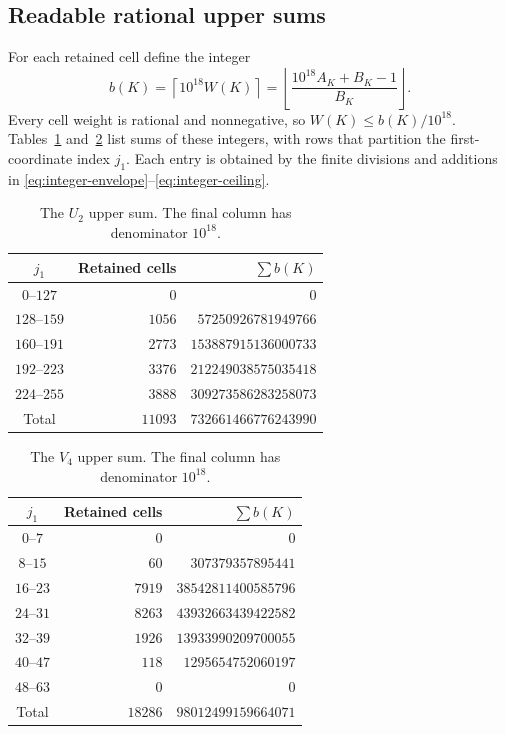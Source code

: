 \documentclass{amsart}
\numberwithin{equation}{section}
\numberwithin{table}{section}
\begin{document}
\subsection{Readable rational upper sums}

For each retained cell define the integer
\begin{equation}\label{eq:integer-ceiling}
b(K)=\left\lceil10^{18}W(K)\right\rceil
=\left\lfloor\frac{10^{18}A_K+B_K-1}{B_K}\right\rfloor.
\end{equation}
Every cell weight is rational and nonnegative, so
$W(K)\le b(K)/10^{18}$.
Tables~\ref{tab:U2-integers} and~\ref{tab:V4-integers} list sums of these
integers, with rows that partition the first-coordinate index $j_1$.
Each entry is obtained by the finite divisions and additions
in \eqref{eq:integer-envelope}--\eqref{eq:integer-ceiling}.

\begin{table}[htbp]
\caption{The $U_2$ upper sum. The final column has denominator $10^{18}$.}
\label{tab:U2-integers}
\centering\small
\renewcommand{\arraystretch}{1.2}
\begin{tabular}{@{}crr@{}}
\hline
$j_1$ & Retained cells & $\sum b(K)$\\
\hline
$0$--$127$ & $0$ & $0$\\
$128$--$159$ & $1056$ & $57250926781949766$\\
$160$--$191$ & $2773$ & $153887915136000733$\\
$192$--$223$ & $3376$ & $212249038575035418$\\
$224$--$255$ & $3888$ & $309273586283258073$\\
\hline
Total & $11093$ & $732661466776243990$\\
\hline
\end{tabular}
\end{table}

\begin{table}[htbp]
\caption{The $V_4$ upper sum. The final column has denominator $10^{18}$.}
\label{tab:V4-integers}
\centering\small
\renewcommand{\arraystretch}{1.2}
\begin{tabular}{@{}crr@{}}
\hline
$j_1$ & Retained cells & $\sum b(K)$\\
\hline
$0$--$7$ & $0$ & $0$\\
$8$--$15$ & $60$ & $307379357895441$\\
$16$--$23$ & $7919$ & $38542811400585796$\\
$24$--$31$ & $8263$ & $43932663439422582$\\
$32$--$39$ & $1926$ & $13933990209700055$\\
$40$--$47$ & $118$ & $1295654752060197$\\
$48$--$63$ & $0$ & $0$\\
\hline
Total & $18286$ & $98012499159664071$\\
\hline
\end{tabular}
\end{table}
\end{document}

